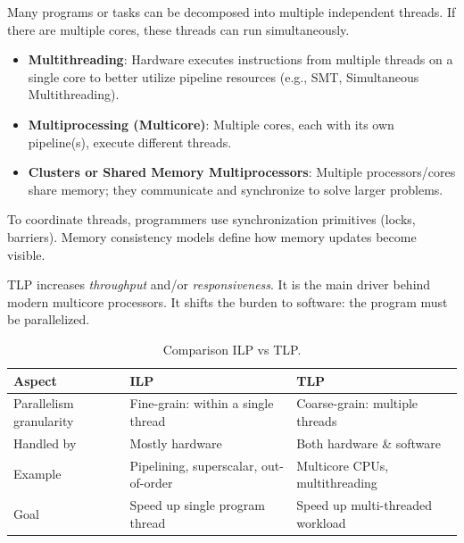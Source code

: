 \begin{itemize}
\begin{itemize}
        Many programs or tasks can be decomposed into multiple independent threads. If there are multiple cores, these threads can run simultaneously.
        \begin{itemize}
            \item \textbf{Multithreading}: Hardware executes instructions from multiple threads on a single core to better utilize pipeline resources (e.g., SMT, Simultaneous Multithreading).
            \item \textbf{Multiprocessing (Multicore)}: Multiple cores, each with its own pipeline(s), execute different threads.
            \item \textbf{Clusters or Shared Memory Multiprocessors}: Multiple processors/cores share memory; they communicate and synchronize to solve larger problems.
        \end{itemize}
        To coordinate threads, programmers use synchronization primitives (locks, barriers). Memory consistency models define how memory updates become visible.

        TLP increases \emph{throughput} and/or \emph{responsiveness}. It is the main driver behind modern multicore processors. It shifts the burden to software: the program must be parallelized.
    \end{itemize}

    \begin{table}[!htp]
        \centering
        \begin{adjustbox}{width={\textwidth},totalheight={\textheight},keepaspectratio}
            \begin{tabular}{@{} l l l @{}}
                \toprule
                Aspect & ILP & TLP \\
                \midrule
                Parallelism granularity & Fine-grain: within a single thread    & Coarse-grain: multiple threads    \\ [.3em]
                Handled by              & Mostly hardware                       & Both hardware \& software         \\ [.3em]
                Example                 & Pipelining, superscalar, out-of-order & Multicore CPUs, multithreading    \\ [.3em]
                Goal                    & Speed up single program thread        & Speed up multi-threaded workload  \\
                \bottomrule
            \end{tabular}
        \end{adjustbox}
        \caption{Comparison ILP vs TLP.}
    \end{table}



\end{itemize}
